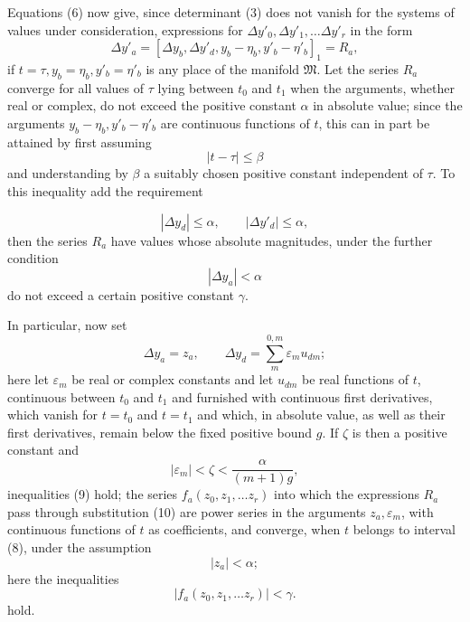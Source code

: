\documentclass[11pt,a4paper,leqno]{article}
\begin{document}
Equations (6) now give, since determinant (3) does not vanish for the
systems of values under consideration, expressions for
$\Delta y'_0,\Delta y'_1,\ldots\Delta y'_r$ in the form
\begin{equation}\tag{7}
\Delta y'_a=[\Delta y_b,\Delta y'_d,y_b-\eta_b,y'_b-\eta'_b]_1=R_a,
\end{equation}
if $t=\tau,y_b=\eta_b,y'_b=\eta'_b$ is any place of the manifold
$\mathfrak M$. Let the series $R_a$ converge for all values of $\tau$
lying between $t_0$ and $t_1$ when the arguments, whether real or complex,
do not exceed the positive constant $\alpha$ in absolute value; since the
arguments $y_b-\eta_b,y'_b-\eta'_b$ are continuous functions of $t$, this
can in part be attained by first assuming
\begin{equation}\tag{8}
|t-\tau|\leq\beta
\end{equation}
and understanding by $\beta$ a suitably chosen positive constant
independent of $\tau$. To this inequality add the requirement

\begin{equation}\tag{9}
|\Delta y_d|\leq\alpha,\qquad |\Delta y'_d|\leq\alpha,
\end{equation}
then the series $R_a$ have values whose absolute magnitudes, under the
further condition
\[
|\Delta y_a|<\alpha
\]
do not exceed a certain positive constant $\gamma$.

In particular, now set
\begin{equation}\tag{10}
\Delta y_a=z_a,\qquad
\Delta y_d=\sum_m^{0,m}\varepsilon_m u_{dm};
\end{equation}
here let $\varepsilon_m$ be real or complex constants and let $u_{dm}$
be real functions of $t$, continuous between $t_0$ and $t_1$ and furnished
with continuous first derivatives, which vanish for $t=t_0$ and $t=t_1$
and which, in absolute value, as well as their first derivatives, remain
below the fixed positive bound $g$. If $\zeta$ is then a positive constant
and
\[
|\varepsilon_m|<\zeta<\frac{\alpha}{(m+1)g},
\]
inequalities (9) hold; the series $f_a(z_0,z_1,\ldots z_r)$ into which the
expressions $R_a$ pass through substitution (10) are power series in the
arguments $z_a,\varepsilon_m$, with continuous functions of $t$ as
coefficients, and converge, when $t$ belongs to interval (8), under the
assumption
\[
|z_a|<\alpha;
\]
here the inequalities
\begin{equation}\tag{11}
|f_a(z_0,z_1,\ldots z_r)|<\gamma.
\end{equation}
hold.
\end{document}

